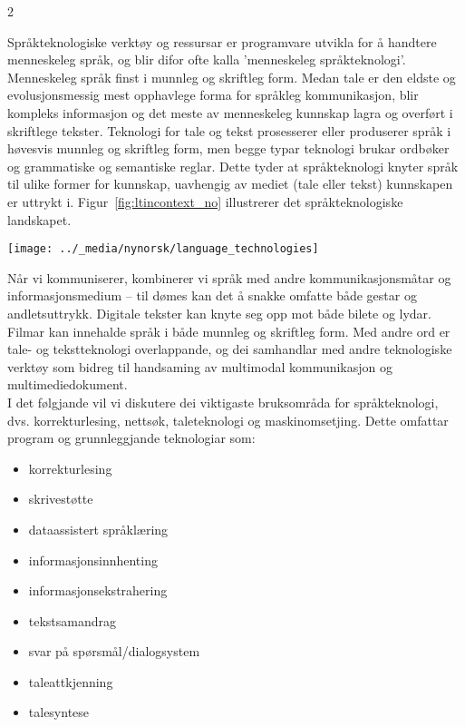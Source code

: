 \clearpage


\begin{multicols}{2}

Språkteknologiske verktøy og ressursar er programvare utvikla for å handtere menneskeleg språk, og blir difor ofte kalla 'menneskeleg språkteknologi'. 
Menneskeleg språk finst i munnleg og skriftleg form. Medan tale er den eldste og evolusjonsmessig mest opphavlege forma for språkleg kommunikasjon, blir kompleks informasjon og det meste av menneskeleg kunnskap lagra og overført i skriftlege tekster. Teknologi for tale og tekst prosesserer eller produserer språk i høvesvis munnleg og skriftleg form, men begge typar teknologi brukar ordbøker og grammatiske og semantiske reglar. Dette tyder at språkteknologi knyter språk til ulike former for kunnskap, uavhengig av mediet (tale eller tekst) kunnskapen er uttrykt i. Figur~\ref{fig:ltincontext_no} illustrerer det språkteknologiske landskapet.

\begin{figure*}[htb]
  \center
  \texttt{[image: ../\_media/nynorsk/language\_technologies]}
  \caption{Språkteknologi i kontekst}
  \label{fig:ltincontext_no}
\end{figure*}

Når vi kommuniserer, kombinerer vi språk med andre kommunikasjonsmåtar og informasjonsmedium – til dømes kan det å snakke omfatte både gestar og andletsuttrykk. Digitale tekster kan knyte seg opp mot både bilete og lydar. Filmar kan innehalde språk i både munnleg og skriftleg form. Med andre ord er tale- og tekstteknologi overlappande, og dei samhandlar med andre teknologiske verktøy som bidreg til handsaming av multimodal kommunikasjon og multimediedokument.\\ 
I det følgjande vil vi diskutere dei viktigaste bruksområda for språkteknologi, dvs. korrekturlesing, nettsøk, taleteknologi og maskinomsetjing. Dette omfattar program og grunnleggjande teknologiar som:

\begin{itemize}
\item korrekturlesing
\item skrivestøtte
\item dataassistert språklæring
\item informasjonsinnhenting  
\item informasjonsekstrahering
\item tekstsamandrag
\item svar på spørsmål/dialogsystem
\item taleattkjenning 
\item talesyntese 
\end{itemize}


\end{multicols}
